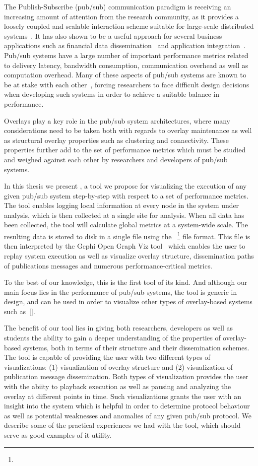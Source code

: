 The Publish-Subscribe (pub/sub) communication paradigm is receiving an
increasing amount of attention from the research community, as it
provides a loosely coupled and scalable interaction scheme suitable for
large-scale distributed systems~\cite{Eugster:2003}. It has also shown
to be a useful approach for several business applications such as
financial data dissemination~\cite{tibcorv} and application
integration~\cite{goops}. Pub/sub systems have a large number of
important performance metrics related to delivery latency, bandwidth
consumption, communication overhead as well as computation overhead.
Many of these aspects of pub/sub systems are known to be at stake with
each other~\cite{}, forcing researchers to face difficult design
decisions when developing such systems in order to achieve a suitable
balance in performance.

Overlays play a key role in the pub/sub system architectures, where many
considerations need to be taken both with regards to overlay maintenance
as well as structural overlay properties such as clustering and
connectivity. These properties further add to the set of performance
metrics which must be studied and weighed against each other by
researchers and developers of pub/sub systems.

In this thesis we present \demo{}, a tool we propose for visualizing the
execution of any given pub/sub system step-by-step with respect to a set
of performance metrics. The tool enables logging local information at
every node in the system under analysis, which is then collected at a
single site for analysis. When all data has been collected, the tool
will calculate global metrics at a system-wide scale. The resulting
data is stored to disk in a single file using the \gexf{}~\footnote{}
file format. This file is then interpreted by the Gephi Open Graph Viz
tool~\cite{} which enables the user to replay system execution as well as visualize
overlay structure, dissemination paths of publications messages and
numerous performance-critical metrics.

To the best of our knowledge, this is the first tool of its kind. And
although our main focus lies in the performance of pub/sub
systems, the tool is generic in design, and can be used in order to
visualize other types of overlay-based systems such as~\ref{}.

The benefit of our tool lies in giving both researchers, developers as
well as students the ability to gain a deeper understanding of the
properties of overlay-based systems, both in terms of their structure
and their dissemination schemes. The tool is capable of providing the
user with two different types of visualizations: (1) visualization of
overlay structure and (2) visualization of publication message
dissemination. Both types of visualization provides the user with the
abiity to playback execution as well as pausing and analyzing the overlay at
different points in time. Such visualizations grants the user with an
insight into the system which is helpful in order to determine protocol
behaviour as well as potential weaknesses and anomalies of any given
pub/sub protocol. We describe some of the practical experiences we had
with the tool, which should serve as good examples of it utility.


